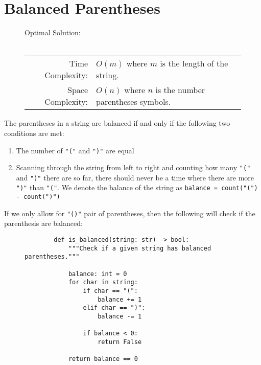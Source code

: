 
\section{Balanced Parentheses}

\begin{figure}[H]
    Optimal Solution:\\\\
    \begin{tabular}{rl}
        Time Complexity:& \(O(m)\) where \(m\) is the length of the string.\\
        Space Complexity:& \(O(n)\) where \(n\) is the number parentheses
        symbols.
    \end{tabular}
\end{figure}

The parentheses in a string are balanced if and only if the following two
conditions are met:

\begin{enumerate}
    \item The number of \texttt{"("} and \texttt{")"}
          are equal
    \item Scanning through the string from left to right and counting how many
          \texttt{"("} and \texttt{")"} there are so
          far, there should never be a time where there are more
          \texttt{")"} than \texttt{"("}. We denote the
          balance of the string as
          \texttt{balance = count("(") - count(")")}
\end{enumerate}

If we only allow for \texttt{"()"} pair of parentheses, then the
following will check if the parenthesis are balanced:

\begin{figure}[H]
    \centering
    \begin{verbatim}
        def is_balanced(string: str) -> bool:
            """Check if a given string has balanced parentheses."""

            balance: int = 0
            for char in string:
                if char == "(":
                    balance += 1
                elif char == ")":
                    balance -= 1

                if balance < 0:
                    return False

            return balance == 0
    \end{verbatim}
\end{figure}

